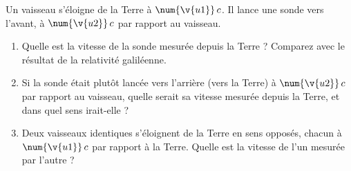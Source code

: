 Un vaisseau s'éloigne de la Terre à $\num{\v{u1}}\,c$. Il lance une sonde vers l'avant, à $\num{\v{u2}}\,c$ par rapport au vaisseau.

\begin{enumerate}[label=\alph*)]
    \item Quelle est la vitesse de la sonde mesurée depuis la Terre ? Comparez avec le résultat de la relativité galiléenne.
    \item Si la sonde était plutôt lancée vers l'arrière (vers la Terre) à $\num{\v{u2}}\,c$ par rapport au vaisseau, quelle serait sa vitesse mesurée depuis la Terre, et dans quel sens irait-elle ?
    \item Deux vaisseaux identiques s'éloignent de la Terre en sens opposés, chacun à $\num{\v{u1}}\,c$ par rapport à la Terre. Quelle est la vitesse de l'un mesurée par l'autre ?
\end{enumerate}
